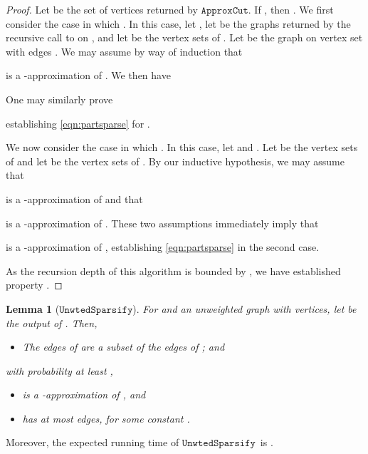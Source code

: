 \documentclass[11pt]{article}
\newtheorem{lemma}[theorem]{Lemma}
\newcommand{\unwtedsparsify}{\ensuremath{\mathtt{UnwtedSparsify}}}
\newcommand{\approxcut}{\ensuremath{\mathtt{ApproxCut}}}
\begin{document}
\begin{proof}
Let  be the set of vertices returned by \approxcut.
If , then .
We first consider the case in which
  .
In this case, let
  ,
 let  
  be the graphs returned by
  the recursive call to  on ,
  and let  be the vertex sets of .
Let  be the graph on vertex set  with edges .
We may assume by way of induction that

is a -approximation of .
We then have

One may similarly prove

establishing \eqref{eqn:partsparse} for .

We now consider the case in which
  .
In this case, let
   and .
Let  be the vertex sets of 
  and let 
  be the vertex sets of .
By our inductive hypothesis, we may assume that

  is a -approximation of  and that

  is a -approximation of .
These two assumptions immediately imply that

is a -approximation of ,
  establishing \eqref{eqn:partsparse} in the second case.

As the recursion depth of this algorithm is bounded by
  , we have established property .
\end{proof}


\begin{lemma}[\unwtedsparsify]\label{lem:unwtsparsify}
For  and an unweighted graph  with  vertices, let
 be the output of .
Then,
\begin{itemize}
\item [(U.1)] The edges of  are a subset of the edges of ; and
\end{itemize}
 with probability at least ,
\begin{itemize}
\item [(U.2)]  is a -approximation of , and
\item [(U.3)]  has at most 
  edges, for some constant .
\end{itemize}
\end{lemma}
Moreover, the expected running time of \unwtedsparsify \ is 
  .
\end{document}
